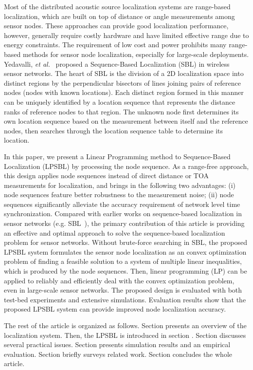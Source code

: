 Most of the distributed acoustic source localization systems are range-based localization, which are built on top of distance or angle measurements among sensor nodes. 
These approaches can provide good localization performance, however, generally require costly hardware and have limited effective range due to energy constraints. 
The requirement of low cost and power prohibits many range-based methods for sensor node localization, especially for large-scale deployments. 
Yedavalli, \emph{et al.}~\cite{yedavalli2008sequence} proposed a Sequence-Based Localization (SBL) in wireless sensor networks. The heart of SBL is the division of a 2D localization space into distinct regions by the perpendicular bisectors of lines joining pairs of reference nodes (nodes with known locations).
Each distinct region formed in this manner can be uniquely identified by a location sequence that represents the distance ranks of reference nodes to that region. 
The unknown node first determines its own location sequence based on the measurement between itself and the reference nodes, then searches through the location sequence table to determine its location.

In this paper, we present a Linear Programming method to Sequence-Based Localization (LPSBL) by processing the node sequence. 
As a range-free approach, this design applies node sequences instead of direct distance
or TOA measurements for localization, and brings in the following two advantages: (i) node sequences feature better
robustness to the measurement noise; (ii) node sequences significantly alleviate the accuracy requirement of network level time synchronization. 
Compared with earlier works on sequence-based localization in sensor
networks (e.g. SBL~\cite{yedavalli2008sequence}), the primary contribution
of this article is providing an effective and optimal approach
to solve the sequence-based localization problem for sensor networks. 
Without brute-force searching in SBL, the proposed LPSBL system formulates the
sensor node localization as an convex optimization problem
of finding a feasible solution to a system of multiple linear
inequalities, which is produced by the node sequences.
Then, linear programming (LP) can be applied to reliably
and efficiently deal with the convex optimization problem,
even in large-scale sensor networks. The proposed design
is evaluated with both test-bed experiments and extensive
simulations. Evaluation results show that the proposed
LPSBL system can provide improved node localization
accuracy.


The rest of the article is organized as follows. Section \uppercase\expandafter{} presents an overview of the  localization system.
Then, the LPSBL is introduced in section \uppercase\expandafter{}.
Section \uppercase\expandafter{} discusses several practical issues.
Section \uppercase\expandafter{} presents simulation results and an empirical evaluation. Section \uppercase\expandafter{} briefly surveys related work.
Section \uppercase\expandafter{} concludes the whole article.



